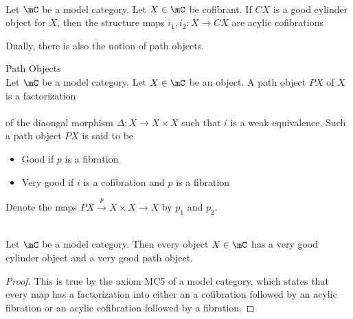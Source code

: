 \documentclass[a4paper]{article}
\begin{document}
\begin{lmm}{}{}\\ Let $\mC$ be a model category. Let $X\in\mC$ be cofibrant. If $CX$ is a good cylinder object for $X$, then the structure maps $i_1,i_2:X\to CX$ are acylic cofibrations
\end{lmm}

Dually, there is also the notion of path objects. 

\begin{defn}{Path Objects}{}\\ Let $\mC$ be a model category. Let $X\in\mC$ be an object. A path object $PX$ of $X$ is a factorization \\
\\
of the diaongal morphism $\Delta:X\to X\times X$ such that $i$ is a weak equivalence. Such a path object $PX$ is said to be 
\begin{itemize}
\item Good if $p$ is a fibration
\item Very good if $i$ is a cofibration and $p$ is a fibration
\end{itemize}
Denote the maps $PX\overset{p}{\longrightarrow}X\times X\to X$ by $p_1$ and $p_2$. 
\end{defn}

\begin{lmm}{}{}\\ Let $\mC$ be a model category. Then every object $X\in\mC$ has a very good cylinder object and a very good path object. 
\begin{proof}
This is true by the axiom MC5 of a model category, which states that every map has a factorization into either an a cofibration followed by an acylic fibration or an acylic cofibration followed by a fibration. 
\end{proof}
\end{lmm}
\end{document}
